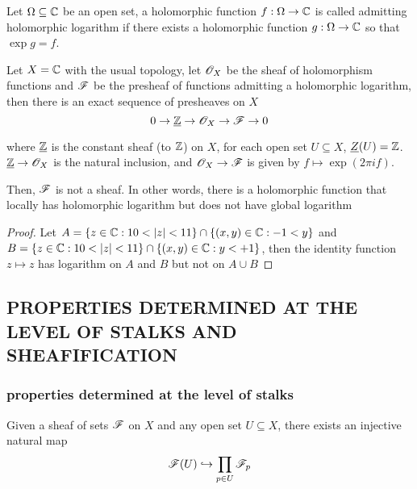 \begin{remark}
	Let $\Omega \subseteq \mathbb{C}$ be an open set, a holomorphic function $f: \Omega \to \mathbb{C}$ is called admitting holomorphic logarithm if there exists a holomorphic function $g: \Omega \to \mathbb{C}$ so that $\exp g = f$.
	
	Let $X = \mathbb{C}$ with the usual topology, let $\mathscr{O}_X$ be the sheaf of holomorphism functions and $\mathscr{F}$ be the presheaf of functions admitting a holomorphic logarithm, then there is an exact sequence of presheaves on $X$
	$$
		0 \to \underline{\mathbb{Z}} \to \mathscr{O}_X \to \mathscr{F} \to 0
	$$
	
	where $\underline{\mathbb{Z}}$ is the constant sheaf (to $\mathbb{Z}$) on $X$, for each open set $U \subseteq X$, $\underline{Z}(U) = \mathbb{Z}$. $\underline{\mathbb{Z}} \to \mathscr{O}_X$ is the natural inclusion, and $\mathscr{O}_X \to \mathscr{F}$ is given by $f \mapsto \exp(2 \pi i f)$.
	
	Then, $\mathscr{F}$ is not a sheaf. In other words, there is a holomorphic function that locally has holomorphic logarithm but does not have global logarithm
\end{remark}

\begin{proof}
	Let $A = \{z \in \mathbb{C}: 10 < |z| < 11\} \cap \{(x, y) \in \mathbb{C}: -1 < y\}$ and $B = \{z \in \mathbb{C}: 10 < |z| < 11\} \cap \{(x, y) \in \mathbb{C}: y < +1\}$, then the identity function $z \mapsto z$ has logarithm on $A$ and $B$ but not on $A \cup B$
\end{proof}

\subsection{PROPERTIES DETERMINED AT THE LEVEL OF STALKS AND SHEAFIFICATION}

\subsubsection{properties determined at the level of stalks}

\begin{proposition}
	Given a sheaf of sets $\mathscr{F}$ on $X$ and any open set $U \subseteq X$, there exists an injective natural map
	$$
		\mathscr{F}(U) \hookrightarrow \prod_{p \in U} \mathscr{F}_p
	$$
\end{proposition}

